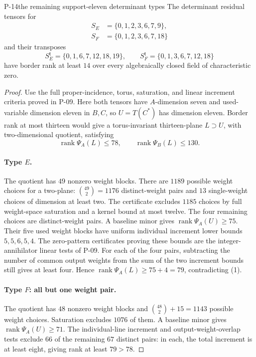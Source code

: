 
\begin{finding}{P-14}{the remaining support-eleven determinant types}
The determinant residual tensors for
\[
 \begin{split}
 S_E&=\{0,1,2,3,6,7,9\},\\
 S_F&=\{0,1,2,3,6,7,18\}
 \end{split}
\]
and their transposes
\[
 S_E^{\mathsf t}=\{0,1,6,7,12,18,19\},\qquad
 S_F^{\mathsf t}=\{0,1,3,6,7,12,18\}
\]
have border rank at least \(14\) over every algebraically
closed field of characteristic zero.
\end{finding}
\begin{proof}
Use the full proper-incidence, torus, saturation, and
linear increment criteria proved in P-09. Here both
tensors have \(A\)-dimension seven and used-variable
dimension eleven in \(B,C\), so \(U=T(C^*)\) has
dimension eleven. Border rank at most thirteen would
give a torus-invariant thirteen-plane \(L\supset U\),
with two-dimensional quotient, satisfying
\[
 \operatorname{rank}\Psi_A(L)\leq78,\qquad
 \operatorname{rank}\Psi_B(L)\leq130.
 \tag{1}
\]

\paragraph{Type \(E\).}
The quotient has \(49\) nonzero weight blocks. There
are \(1189\) possible weight choices for a two-plane:
\(\binom{49}{2}=1176\) distinct-weight pairs and \(13\)
single-weight choices of dimension at least two.
The certificate excludes \(1185\) choices by full
weight-space saturation and a kernel bound at most twelve.
The four remaining choices are distinct-weight pairs.
A baseline minor gives
\(\operatorname{rank}\Psi_A(U)\geq75\).
Their five used weight blocks have uniform individual
increment lower bounds \(5,5,6,5,4\).
The zero-pattern certificates proving these bounds are
the integer-annihilator linear tests of P-09.
For each of the four pairs, subtracting the number of
common output weights from the sum of the two increment
bounds still gives at least four. Hence
\(\operatorname{rank}\Psi_A(L)\geq75+4=79\), contradicting
(1).

\paragraph{Type \(F\): all but one weight pair.}
The quotient has \(48\) nonzero weight blocks and
\(\binom{48}{2}+15=1143\) possible weight choices.
Saturation excludes \(1076\) of them. A baseline minor
gives \(\operatorname{rank}\Psi_A(U)\geq71\).
The individual-line increment and output-weight-overlap
tests exclude \(66\) of the remaining \(67\) distinct
pairs: in each, the total increment is at least eight,
giving rank at least \(79>78\).


\end{proof}
